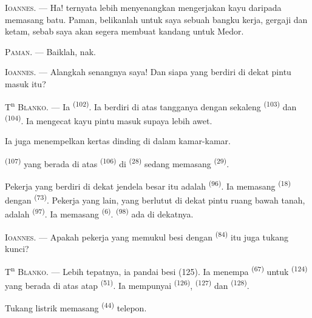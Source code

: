 \textsc{Ioannes}. --- Ha! ternyata lebih menyenangkan mengerjakan kayu
daripada memasang batu. Paman, belikanlah untuk saya sebuah bangku
kerja, gergaji dan ketam, sebab saya akan segera membuat kandang untuk
Medor.

\textsc{Paman}. --- Baiklah, nak.

\textsc{Ioannes}. --- Alangkah senangnya saya! Dan siapa yang berdiri
di dekat pintu masuk itu?

\VUsaut{3.0mm}
\VUsaut{3.0mm}

T\textsuperscript{n} \textsc{Blanko}. --- Ia 
\textsuperscript{(102)}. Ia berdiri di atas tangganya dengan sekaleng
 \textsuperscript{(103)} dan 
\textsuperscript{(104)}. Ia mengecat kayu pintu masuk supaya lebih
awet.

Ia juga menempelkan kertas dinding di dalam kamar-kamar.

 \textsuperscript{(107)} yang berada di atas
 \textsuperscript{(106)} di 
\textsuperscript{(28)} sedang memasang 
\textsuperscript{(29)}.

Pekerja yang berdiri di dekat jendela besar itu adalah  \textsuperscript{(96)}. Ia memasang 
\textsuperscript{(18)} dengan  \textsuperscript{(73)}.
Pekerja yang lain, yang berlutut di dekat pintu ruang bawah tanah,
adalah  \textsuperscript{(97)}. Ia memasang
 \textsuperscript{(6)}. 
\textsuperscript{(98)} ada di dekatnya.

\textsc{Ioannes}. --- Apakah pekerja yang memukul besi dengan
 \textsuperscript{(84)} itu juga tukang kunci?

T\textsuperscript{n} \textsc{Blanko}. --- Lebih tepatnya, ia pandai
besi (125). Ia menempa 
\textsuperscript{(67)} untuk 
\textsuperscript{(124)} yang berada di atas atap 
\textsuperscript{(51)}. Ia mempunyai 
\textsuperscript{(126)},  \textsuperscript{(127)} dan
 \textsuperscript{(128)}.

Tukang listrik memasang  
\textsuperscript{(44)} telepon.

